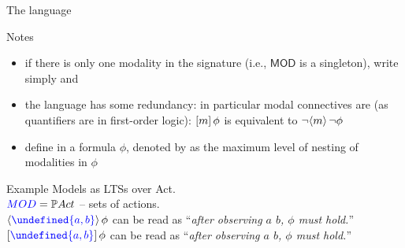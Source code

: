 \documentclass{beamer}
\let\set\undefined
\begin{document}
\begin{slide}{The language}\label{s:11}
\small
\begin{block}{Notes}
\begin{itemize}
\item if there is only one modality in the signature (i.e., $\mathsf{MOD}$ is a singleton), write simply \dgold{$\eventual \phi$} and \dgold{$\always \phi$}
\item the language has some redundancy: in particular modal connectives are  (as quantifiers are in first-order logic):
$[m]\, \phi$ is equivalent to  $\neg \langle m \rangle\, \neg \phi$
\item define  in a formula $\phi$, denoted by \dgold{$\mdepth{\phi}$} as the maximum level of nesting of modalities in $\phi$
\end{itemize}
\end{block}

\begin{exampleblock}{Example}
  Models as LTSs over Act.\\
  $\textcolor{blue}{MOD} = \mathbb{P} {Act}$ -- sets of actions.\\
  $\pv{\dkb{\set{a,b}}} \phi$ can be read as ``\emph{after observing $a$
 $b$, $\phi$ must hold.}''\\
  $\nc{\dkb{\set{a,b}}} \phi$ can be read as ``\emph{after observing $a$  $b$, $\phi$ must hold.}''
\end{exampleblock}

\end{slide}
\end{document}
